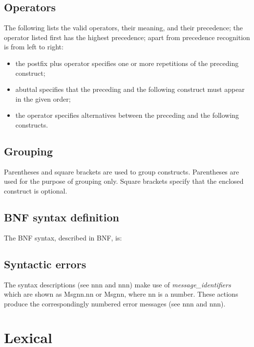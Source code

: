 \subsection{Operators}\label{operators}

The following lists the valid operators, their meaning, and their
precedence; the operator listed first has the highest precedence; apart
from precedence recognition is from left to right:

\begin{itemize}
\item
  the postfix plus operator specifies one or more repetitions of the
  preceding construct;
\item
  abuttal specifies that the preceding and the following construct must
  appear in the given order;
\item
  the operator \texttt{\textquotesingle{}\textbar{}\textquotesingle{}}
  specifies alternatives between the preceding and the following
  constructs.
\end{itemize}

\subsection{Grouping}\label{grouping}

Parentheses and square brackets are used to group constructs.
Parentheses are used for the purpose of grouping only. Square brackets
specify that the enclosed construct is optional.

\subsection{BNF syntax definition}\label{bnf-syntax-definition}

The BNF syntax, described in BNF, is:



\subsection{Syntactic errors}\label{syntactic-errors}

The syntax descriptions (see nnn and nnn) make use of
\emph{message\_identifiers} which are shown as Msgnn.nn or Msgnn, where
nn is a number. These actions produce the correspondingly numbered error
messages (see nnn and nnn).

\section{Lexical}\label{lexical}

